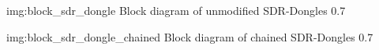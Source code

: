 

\usepackage{antalike_en}


 \anttitle

 

 

              {img:block_sdr_dongle}
              {Block diagram of unmodified SDR-Dongles}
              {0.7}

              {img:block_sdr_dongle_chained}
              {Block diagram of chained SDR-Dongles}
              {0.7}

